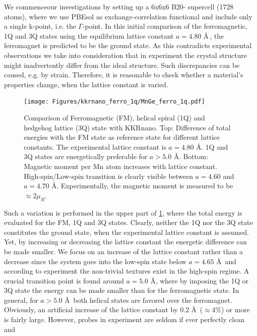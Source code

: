 \documentclass[graybox]{svmult}
\begin{document}
We commenceour investigations by setting up a 6x6x6 B20- supercell (1728 atoms), where we use PBEsol 
as exchange-correlation functional
and include only a single k-point, i.e. the $\Gamma$-point.
In this initial comparison of the ferromagnetic, 1Q and 3Q states using the equilibrium lattice constant
$a=4.80$ \AA \,, the ferromagnet is predicted to be the ground state.
As this contradicts experimental observations we take into consideration that
in experiment the crystal structure might inadvertently differ from the ideal structure.
Such discrepancies can be caused, e.g. by strain.
Therefore, it is reasonable to check whether a material's properties change, when the
lattice constant is varied.
\begin{figure}[htb]
\begin{center}
 \texttt{[image: Figures/kkrnano\_ferro\_1q/MnGe\_ferro\_1q.pdf]}
\end{center}
\caption{
	Comparison of Ferromagnetic (FM), helical spiral (1Q) and hedgehog lattice (3Q) state with KKRnano.
	Top: Difference of total energies with the FM state as reference state for different lattice constants. 
	The experimental lattice constant is $a = 4.80$ \AA. 1Q and 3Q states are energetically preferable 
	for $a > 5.0$ \AA. Bottom: Magnetic moment per Mn atom increases with lattice constant. 
	High-spin/Low-spin transition is clearly visible between $a = 4.60$ and $a = 4.70$ \AA.
	Experimentally, the magnetic moment is measured to be $\approx 2 \mu_{B}$.
	}
\label{fig:MnGe_ferro_1q}
\end{figure}
Such a variation is performed in the upper part of \cref{fig:MnGe_ferro_1q}, where
the total energy is evaluated for the FM, 1Q and 3Q states.
Clearly, neither the 1Q nor the 3Q state constitutes the ground state,
when the experimental lattice constant is assumed.
Yet, by increasing or decreasing the lattice constant the energetic difference can be made
smaller.
We focus on an increase of the lattice constant rather than a decrease since 
the system goes into the low-spin state below $a=4.65$ \AA \, and according to experiment
the non-trivial textures
exist in the high-spin regime.
A crucial transition point is found around $a=5.0$ \AA,
where by imposing the 1Q or 3Q state the energy can be made smaller than for the ferromagnetic state.
In general, for $a>5.0$ \AA \, both helical states are favored over the ferromagnet.
Obviously, an artificial increase of the lattice constant by
$0.2$ \AA \, ($\approx 4 \%$) or more is fairly large.
However, probes in experiment are seldom if ever perfectly clean and
\end{document}
